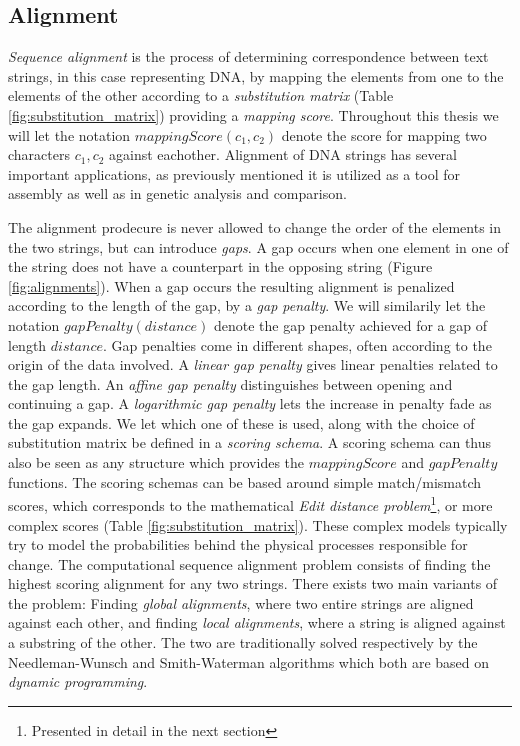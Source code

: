 \documentclass[thesis.tex]{subfiles}
\begin{document}
\subsection{Alignment}
\label{sec:alignment}
\textit{Sequence alignment} is the process of determining correspondence between text strings, in this case representing DNA, by mapping the elements from one to the elements of the other according to a \textit{substitution matrix} (Table \ref{fig:substitution_matrix}) providing a \textit{mapping score}. Throughout this thesis we will let the notation $mappingScore(c_1,c_2)$ denote the score for mapping two characters $c_1, c_2$ against eachother. Alignment of DNA strings has several important applications, as previously mentioned it is utilized as a tool for assembly as well as in genetic analysis and comparison.\\
\par\noindent
The alignment prodecure is never allowed to change the order of the elements in the two strings, but can introduce \textit{gaps}. A gap occurs when one element in one of the string does not have a counterpart in the opposing string (Figure \ref{fig:alignments}). When a gap occurs the resulting alignment is penalized according to the length of the gap, by a \textit{gap penalty}. We will similarily let the notation $gapPenalty(distance)$ denote the gap penalty achieved for a gap of length $distance$. Gap penalties come in different shapes, often according to the origin of the data involved. A \textit{linear gap penalty} gives linear penalties related to the gap length. An \textit{affine gap penalty} distinguishes between opening and continuing a gap. A \textit{logarithmic gap penalty} lets the increase in penalty fade as the gap expands. We let which one of these is used, along with the choice of substitution matrix be defined in a \textit{scoring schema}. A scoring schema can thus also be seen as any structure which provides the $mappingScore$ and $gapPenalty$ functions. The scoring schemas can be based around simple match/mismatch scores, which corresponds to the mathematical \textit{Edit distance problem}\footnote{Presented in detail in the next section}, or more complex scores (Table \ref{fig:substitution_matrix}). These complex models typically try to model the probabilities behind the physical processes responsible for change. The computational sequence alignment problem consists of finding the highest scoring alignment for any two strings. There exists two main variants of the problem: Finding \textit{global alignments}, where two entire strings are aligned against each other, and finding \textit{local alignments}, where a string is aligned against a substring of the other. The two are traditionally solved respectively by the Needleman-Wunsch and Smith-Waterman algorithms which both are based on \textit{dynamic programming}.\\
\end{document}
